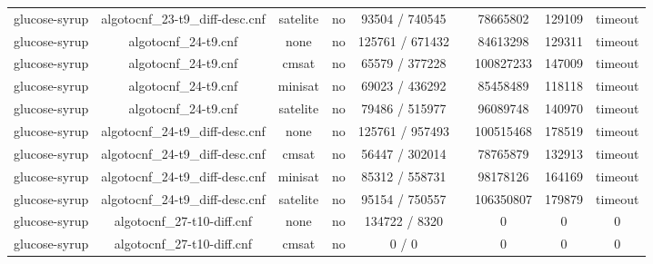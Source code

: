 \begin{appendices}
\begin{table}[p]
\begin{center}
\begin{tabular}{l|cccccccc}
  glucose-syrup                  & algotocnf\_23-t9\_diff-desc.cnf & satelite   & no    & 93504 / 740545 &           & 78665802  & 129109     & timeout \\ %
  glucose-syrup                  & algotocnf\_24-t9.cnf           & none       & no    & 125761 / 671432 &           & 84613298  & 129311     & timeout \\ %
  glucose-syrup                  & algotocnf\_24-t9.cnf           & cmsat      & no    & 65579 / 377228 &           & 100827233 & 147009     & timeout \\ %
  glucose-syrup                  & algotocnf\_24-t9.cnf           & minisat    & no    & 69023 / 436292 &           & 85458489  & 118118     & timeout \\ %
  glucose-syrup                  & algotocnf\_24-t9.cnf           & satelite   & no    & 79486 / 515977 &           & 96089748  & 140970     & timeout \\ %
  glucose-syrup                  & algotocnf\_24-t9\_diff-desc.cnf & none       & no    & 125761 / 957493 &           & 100515468 & 178519     & timeout \\ %
  glucose-syrup                  & algotocnf\_24-t9\_diff-desc.cnf & cmsat      & no    & 56447 / 302014 &           & 78765879  & 132913     & timeout \\ %
  glucose-syrup                  & algotocnf\_24-t9\_diff-desc.cnf & minisat    & no    & 85312 / 558731 &           & 98178126  & 164169     & timeout \\ %
  glucose-syrup                  & algotocnf\_24-t9\_diff-desc.cnf & satelite   & no    & 95154 / 750557 &           & 106350807 & 179879     & timeout \\ %
  glucose-syrup                  & algotocnf\_27-t10-diff.cnf     & none       & no    & 134722 / 8320 &           & 0         & 0          & 0 \\ %
  glucose-syrup                  & algotocnf\_27-t10-diff.cnf     & cmsat      & no    & 0 / 0      &           & 0         & 0          & 0 \\ %

\end{tabular}
\end{center}
\end{table}
\end{appendices}
